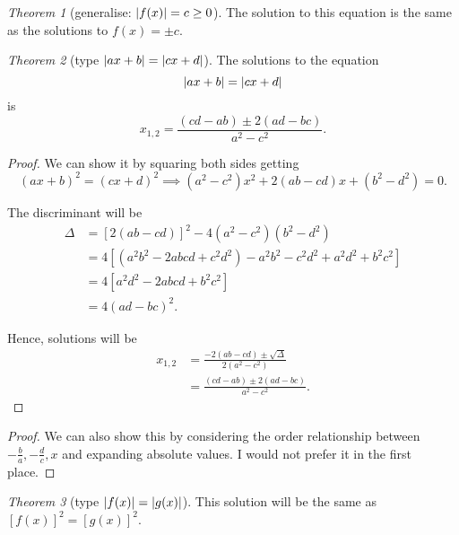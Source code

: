 \documentclass[8pt]{article}
\theoremstyle{remark}
\newtheorem{theorem}{Theorem}[section]
\begin{document}
        \begin{theorem}[generalise: $\left\lvert f(x) \right\rvert = c \geq 0$]
            The solution to this equation is the same as the solutions to $f(x) = \pm c$.
        \end{theorem}

        \begin{theorem}[type $\left\lvert ax + b \right\rvert = \left\lvert cx + d \right\rvert$]
            The solutions to the equation
            $$
            \left\lvert ax + b \right\rvert = \left\lvert cx + d \right\rvert
            $$
            is
            $$
            x_{1, 2} = \frac{(cd - ab) \pm 2 (ad - bc)}{a^2 - c^2}.
            $$

            \begin{proof}
                We can show it by squaring both sides getting
                $$
                (ax + b)^2 = (cx + d)^2 \implies (a^2 - c^2)x^2 + 2(ab - cd) x + (b^2 - d^2) = 0.
                $$

                The discriminant will be
                \begin{align*}
                    \Delta &= [2(ab - cd)]^2 - 4 (a^2 - c^2) (b^2 - d^2)\\
                    &= 4 [(a^2 b^2 - 2abcd + c^2 d^2) - a^2b^2 - c^2d^2 + a^2 d^2 + b^2 c^2]\\
                    &= 4 [a^2 d^2 - 2abcd + b^2 c^2]\\
                    &= 4 (ad - bc)^2.
                \end{align*}

                Hence, solutions will be
                \begin{align*}
                    x_{1, 2} &= \frac{- 2 (ab - cd) \pm \sqrt{\Delta}}{2 (a^2 - c^2)}\\
                    &= \frac{(cd - ab) \pm 2 (ad - bc)}{a^2 - c^2}.
                \end{align*}
            \end{proof}

            \begin{proof}
                We can also show this by considering the order relationship between $-\frac{b}{a}, - \frac{d}{c}, x$ and expanding absolute values. I would not prefer it in the first place.
            \end{proof}
        \end{theorem}

        \begin{theorem}[type $\left\lvert f(x) \right\rvert = \left\lvert g(x) \right\rvert$]
            This solution will be the same as $[f(x)]^2 = [g(x)]^2$.
        \end{theorem}
\end{document}

